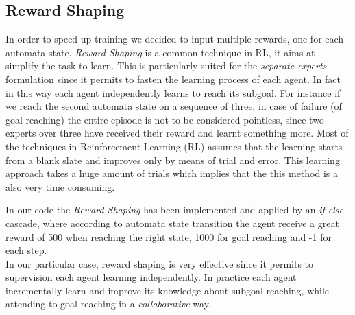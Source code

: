 \documentclass{article}
\renewcommand{\texttt}[1]{%
  \begingroup
  \ttfamily
  \begingroup\lccode`~=`/\lowercase{\endgroup\def~}{/\discretionary{}{}{}}%
  \begingroup\lccode`~=`[\lowercase{\endgroup\def~}{[\discretionary{}{}{}}%
  \begingroup\lccode`~=`.\lowercase{\endgroup\def~}{.\discretionary{}{}{}}%
  \catcode`/=\active\catcode`[=\active\catcode`.=\active
  \scantokens{#1\noexpand}%
  \endgroup
}
\begin{document}
\subsection{Reward Shaping}\label{sec:rewardShaping} %
In order to speed up training we decided to 
input multiple rewards, one for each automata state. \textit{Reward Shaping} is a common technique in RL, it aims at simplify the task to learn. This is particularly suited for the \textit{separate experts} formulation since it permits to fasten the learning process of each agent. In fact in this way each agent independently learns to reach its subgoal. For instance if we reach the second automata state on a sequence of three, in case of failure (of goal reaching) the entire episode is not to be considered pointless, since two experts over three have received their reward and learnt something more.
Most of the techniques in Reinforcement Learning (RL) assumes that the learning starts from a blank slate and improves only by means of trial and error. This learning approach takes a huge amount of trials which implies that the this method is a also very time consuming. 


In our code the \textit{Reward Shaping} has been implemented and applied by an \textit{if-else} cascade, where according to automata state transition the agent receive a great reward of 500 when reaching the right state, 1000 for goal reaching and -1 for each step.\\
In our particular case, reward shaping is very effective since it permits to supervision each agent learning independently. In practice each agent incrementally learn and improve its knowledge about subgoal reaching, while attending to goal reaching in a \textit{collaborative} way.

\end{document}
